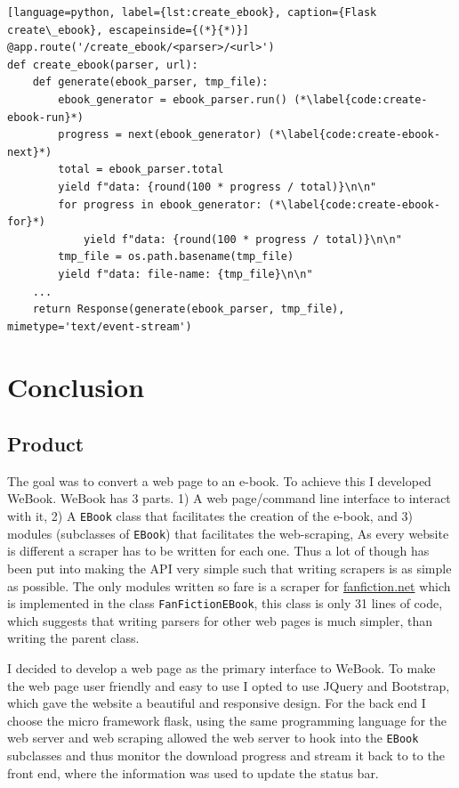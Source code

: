 \documentclass[]{report}   %
\begin{document}
\begin{minipage}{\linewidth}
\begin{lstlisting}[language=python, label={lst:create_ebook}, caption={Flask create\_ebook}, escapeinside={(*}{*)}]
@app.route('/create_ebook/<parser>/<url>')
def create_ebook(parser, url):
    def generate(ebook_parser, tmp_file):
		ebook_generator = ebook_parser.run() (*\label{code:create-ebook-run}*)
		progress = next(ebook_generator) (*\label{code:create-ebook-next}*)
        total = ebook_parser.total
        yield f"data: {round(100 * progress / total)}\n\n"
		for progress in ebook_generator: (*\label{code:create-ebook-for}*)
            yield f"data: {round(100 * progress / total)}\n\n"
        tmp_file = os.path.basename(tmp_file)
        yield f"data: file-name: {tmp_file}\n\n"
	...
    return Response(generate(ebook_parser, tmp_file), mimetype='text/event-stream')
\end{lstlisting}
\end{minipage}

\chapter{Conclusion}
\section{Product}
The goal was to convert a web page to an e-book. To achieve this I developed
WeBook. WeBook has 3 parts. 1) A web page/command line interface to interact
with it, 2) A \texttt{EBook} class that facilitates the creation of the e-book,
and 3) modules (subclasses of \texttt{EBook}) that facilitates the web-scraping,
As every website is different a scraper has to be written for each one. Thus a
lot of though has been put into making the API very simple such that writing
scrapers is as simple as possible. The only modules written so fare is a scraper
for \url{fanfiction.net} which is implemented in the class
\texttt{FanFictionEBook}, this class is only 31 lines of code, which suggests
that writing parsers for other web pages is much simpler, than writing the
parent class.

I decided to develop a web page as the primary interface to WeBook. To make the
web page user friendly and easy to use I opted to use JQuery\cite{jquery}
and Bootstrap\cite{bootstrap}, which gave the website a beautiful and
responsive design. For the back end I choose the micro framework
flask\cite{flask}, using the same programming language for the web server and
web scraping allowed the web server to hook into the \texttt{EBook} subclasses
and thus monitor the download progress and stream it back to to the front end,
where the information was used to update the status bar.
\end{document}
